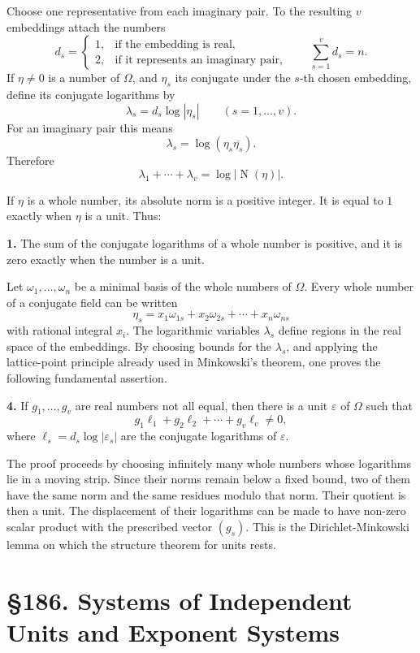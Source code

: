\documentclass[12pt,a4paper]{article}
\newcommand{\webersection}[2]{\clearpage\section*{\S #1. #2}}
\newcommand{\N}{\operatorname{N}}
\begin{document}
Choose one representative from each imaginary pair.  To the resulting \(v\) embeddings attach the numbers
\[
  d_s=\begin{cases}
  1,&\text{if the embedding is real},\\
  2,&\text{if it represents an imaginary pair},
  \end{cases}
\qquad
  \sum_{s=1}^v d_s=n.
\tag{1}
\]
If \(\eta\ne0\) is a number of \(\Omega\), and \(\eta_s\) its conjugate under the \(s\)-th chosen embedding, define its conjugate logarithms by
\[
  \lambda_s=d_s\log|\eta_s|\qquad(s=1,
\ldots,v).
\tag{2}
\]
For an imaginary pair this means
\[
  \lambda_s=\log(\eta_s\overline{\eta_s}).
\]
Therefore
\[
  \lambda_1+\cdots+\lambda_v=\log|
\N(\eta)|.
\tag{3}
\]

If \(\eta\) is a whole number, its absolute norm is a positive integer.  It is equal to \(1\) exactly when \(\eta\) is a unit.  Thus:

\textbf{1.} The sum of the conjugate logarithms of a whole number is positive, and it is zero exactly when the number is a unit.

Let \(\omega_1,
\ldots,
\omega_n\) be a minimal basis of the whole numbers of \(\Omega\).  Every whole number of a conjugate field can be written
\[
  \eta_s=x_1\omega_{1s}+x_2\omega_{2s}+\cdots+x_n\omega_{ns}
\tag{4}
\]
with rational integral \(x_i\).  The logarithmic variables \(\lambda_s\) define regions in the real space of the embeddings.  By choosing bounds for the \(\lambda_s\), and applying the lattice-point principle already used in Minkowski's theorem, one proves the following fundamental assertion.

\textbf{4.} If \(g_1,
\ldots,g_v\) are real numbers not all equal, then there is a unit \(\varepsilon\) of \(\Omega\) such that
\[
  g_1\ell_1+g_2\ell_2+\cdots+g_v\ell_v\ne0,
\tag{5}
\]
where \(\ell_s=d_s\log|\varepsilon_s|\) are the conjugate logarithms of \(\varepsilon\).

The proof proceeds by choosing infinitely many whole numbers whose logarithms lie in a moving strip.  Since their norms remain below a fixed bound, two of them have the same norm and the same residues modulo that norm.  Their quotient is then a unit.  The displacement of their logarithms can be made to have non-zero scalar product with the prescribed vector \((g_s)\).  This is the Dirichlet-Minkowski lemma on which the structure theorem for units rests.

\webersection{186}{Systems of Independent Units and Exponent Systems}
\end{document}
